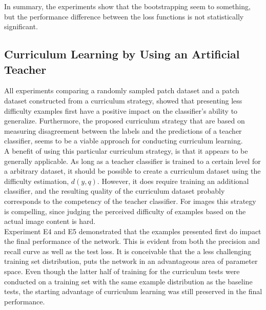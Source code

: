 In summary, the experiments show that the bootstrapping seem to something, but the performance difference between the loss functions is not statistically significant.\\


\subsection{Curriculum Learning by Using an Artificial Teacher}

All experiments comparing a randomly sampled patch dataset and a patch dataset constructed from a curriculum strategy, showed that presenting less difficulty examples first have a positive impact on the classifier's ability to generalize. Furthermore, the proposed curriculum strategy that are based on measuring disagreement between the labels and the predictions of a teacher classifier, seems to be a viable approach for conducting curriculum learning.\\

A benefit of using this particular curriculum strategy, is that it appears to be generally applicable. As long as a teacher classifier is trained to a certain level for a arbitrary dataset, it should be possible to create a curriculum dataset using the difficulty estimation, $d(y,q)$. However, it does require training an additional classifier, and the resulting quality of the curriculum dataset probably corresponds to the competency of the teacher classifier. For images this strategy is compelling, since judging the perceived difficulty of examples based on the actual image content is hard.\\

Experiment E4 and E5 demonstrated that the examples presented first do impact the final performance of the network. This is evident from both the precision and recall curve as well as the test loss. It is conceivable that the a less challenging training set distribution, puts the network in an advantageous area of parameter space. Even though the latter half of training for the curriculum tests were conducted on a training set with the same example distribution as the baseline tests, the starting advantage of curriculum learning was still preserved in the final performance.  \\


